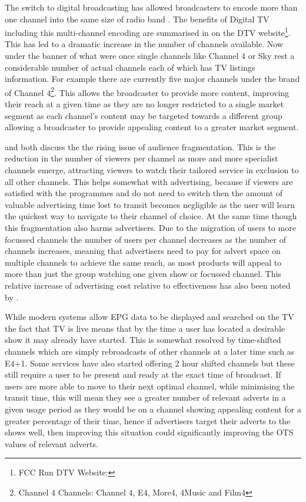 The switch to digital broadcasting has allowed broadcasters to encode more than one channel into the same size of radio band \citep{DTVTransmission}. The benefits of Digital TV including this multi-channel encoding are summarised in on the DTV website\footnote{FCC Run DTV Website: }. This has led to a dramatic increase in the number of channels available. Now under the banner of what were once single channels like Channel 4 or Sky rest a considerable number of actual channels each of which has TV listings information. For example there are currently five major channels under the brand of Channel 4\footnote{Channel 4 Channels: Channel 4, E4, More4, 4Music and Film4}. This allows the broadcaster to provide more content, improving their reach at a given time as they are no longer restricted to a single market segment as each channel's content may be targeted towards a different group allowing a broadcaster to provide appealing content to a greater market segment.

\citet{audienceFragmentation} and \citet{informationOverload} both discuss the the rising issue of audience fragmentation. This is the reduction in the number of viewers per channel as more and more specialist channels emerge, attracting viewers to watch their tailored service in exclusion to all other channels. This helps somewhat with advertising, because if viewers are satisfied with the programmes and do not need to switch then the amount of valuable advertising time lost to transit becomes negligible as the user will learn the quickest way to navigate to their channel of choice. At the same time though this fragmentation also harms advertisers. Due to the migration of users to more focussed channels the number of users per channel decreases as the number of channels increases, meaning that advertisers need to pay for advert space on multiple channels to achieve the same reach, as most products will appeal to more than just the group watching one given show or focussed channel. This relative increase of advertising cost relative to effectiveness has also been noted by \citet{addressableAdvertisingOnDigitalTV}.

While modern systems allow EPG data to be displayed and searched on the TV the fact that TV is live means that by the time a user has located a desirable show it may already have started. This is somewhat resolved by time-shifted channels which are simply rebroadcasts of other channels at a later time such as E4+1. Some services have also started offering 2 hour shifted channels but these still require a user to be present and ready at the exact time of broadcast. If users are more able to move to their next optimal channel, while minimising the transit time, this will mean they see a greater number of relevant adverts in a given usage period as they would be on a channel showing appealing content for a greater percentage of their time, hence if advertisers target their adverts to the shows well, then improving this situation could significantly improving the OTS values of relevant adverts.

